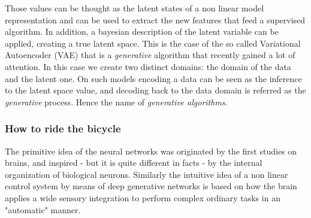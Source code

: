 Those values can be thought as the latent states of a non linear model representation and can be used to extract the new features that feed a supervised algorithm. In addition, a bayesian description of the latent variable can be applied, creating a true latent space. This is the case of the so called Variational Autoencoder (VAE) that is a \textit{generative} algorithm that recently gained a lot of attention.
In this case we create two distinct domains: the domain of the data and the latent one. On such models encoding a data can be seen as the inference to the latent space value, and decoding back to the data domain is referred as the \textit{generative} process. Hence the name of \textit{generative algorithms}.




\subsubsection{How to ride the bicycle}

The primitive idea of the neural networks was originated by the first studies on brains, and inspired - but it is quite different in facts - by the internal organization of biological neurons. Similarly the intuitive idea of a non linear control system by means of deep generative networks is based on how the brain applies a wide sensory integration to perform complex ordinary tasks in an "automatic"  manner. 

